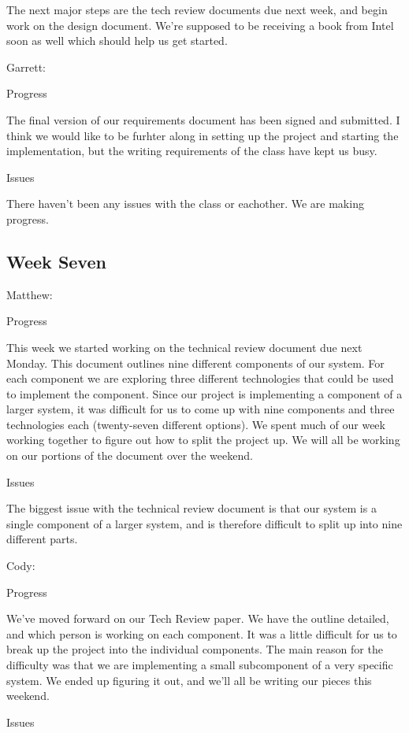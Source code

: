 \documentclass[10pt,onecolumn,journal,draftclsnofoot]{IEEEtran}
\begin{document}
The next major steps are the tech review documents due next week, and begin work
on the design document. We're supposed to be receiving a book from Intel soon as
well which should help us get started.

Garrett:

Progress

The final version of our requirements document has been signed and submitted. I
think we would like to be furhter along in setting up the project and starting
the implementation, but the writing requirements of the class have kept us busy.

Issues

There haven't been any issues with the class or eachother. We are making
progress.

\subsection{Week Seven}

Matthew:

Progress

This week we started working on the technical review document due next Monday.
This document outlines nine different components of our system. For each
component we are exploring three different technologies that could be used to
implement the component. Since our project is implementing a component of a
larger system, it was difficult for us to come up with nine components and three
technologies each (twenty-seven different options). We spent much of our week
working together to figure out how to split the project up. We will all be
working on our portions of the document over the weekend.

Issues

The biggest issue with the technical review document is that our system is a
single component of a larger system, and is therefore difficult to split up into
nine different parts.

Cody:

Progress

We've moved forward on our Tech Review paper. We have the outline detailed, and
which person is working on each component. It was a little difficult for us to
break up the project into the individual components. The main reason for the
difficulty was that we are implementing a small subcomponent of a very specific
system. We ended up figuring it out, and we'll all be writing our pieces this
weekend.

Issues
\end{document}
